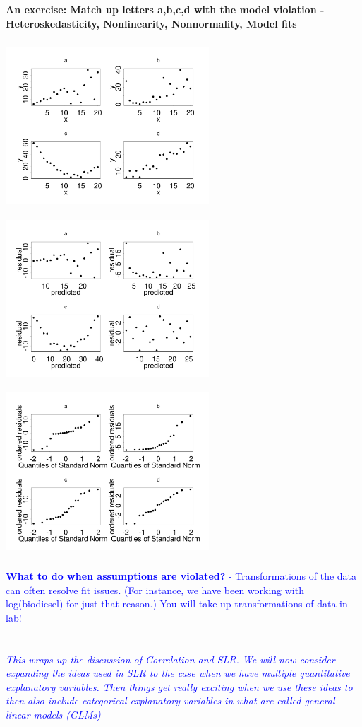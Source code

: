 \textbf{An exercise: Match up letters a,b,c,d with the model violation - Heteroskedasticity, Nonlinearity, Nonnormality, Model fits}
\begin{center}
\includegraphics[height=2.5in,width=3in]{ybyx_handout.pdf}
\includegraphics[height=2.5in,width=3in]{resbypred_handout.pdf}
\includegraphics[height=2.5in,width=3in]{qqnorm_handout.pdf}
\end{center}

\textcolor{blue}{\textbf{What to do when assumptions are violated?} - Transformations of the data can often resolve fit issues.  (For instance, we have been working with log(biodiesel) for just that reason.)  You will take up transformations of data in lab!}\\~\\~\\


\textit{\textcolor{blue}{This wraps up the discussion of Correlation and SLR.  We will now consider expanding the ideas used in SLR to the case when we have multiple quantitative explanatory variables.  Then things get really exciting when we use these ideas to then also include categorical explanatory variables in what are called general linear models (GLMs)}}





